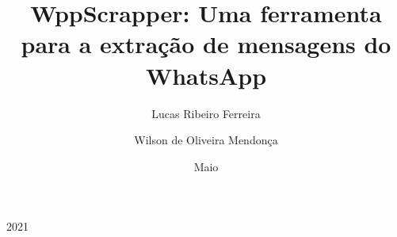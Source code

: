 \documentclass{projetofinal-dcc}
\begin{document}
\title{WppScrapper: Uma ferramenta para a extração de mensagens do WhatsApp}

\author{Lucas Ribeiro Ferreira}{}
\author{Wilson de Oliveira Mendonça}{}





\date{Maio}{2021}
\maketitle

\startdocument



\makethankspage

\begin{abstract}{
  
}
\end{abstract}

\begin{englishabstract}{
  
}
\end{englishabstract}

\makefigurespage

\maketablespage




\maketocpage

\startcontent





% 
% 
\pagebreak



%
\end{document}
